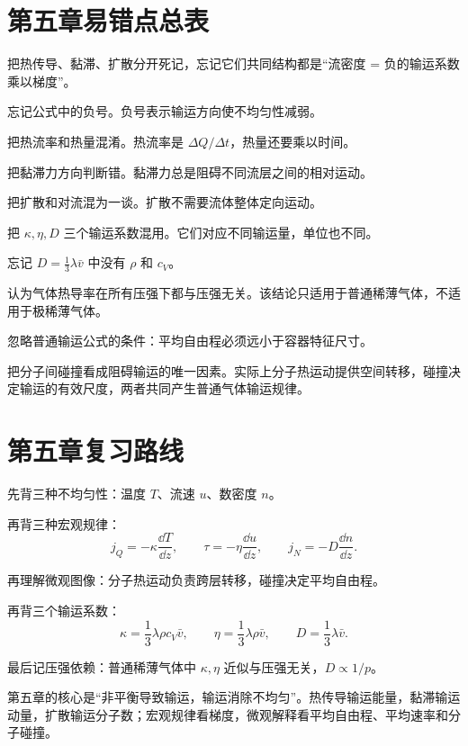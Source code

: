 \section{第五章易错点总表}

\begin{WarnBox}[本章高频错误]
\begin{PitfallList}
  \item 把热传导、黏滞、扩散分开死记，忘记它们共同结构都是“流密度 = 负的输运系数乘以梯度”。
  \item 忘记公式中的负号。负号表示输运方向使不均匀性减弱。
  \item 把热流率和热量混淆。热流率是 \(\Delta Q/\Delta t\)，热量还要乘以时间。
  \item 把黏滞力方向判断错。黏滞力总是阻碍不同流层之间的相对运动。
  \item 把扩散和对流混为一谈。扩散不需要流体整体定向运动。
  \item 把 \(\kappa,\eta,D\) 三个输运系数混用。它们对应不同输运量，单位也不同。
  \item 忘记 \(D=\frac13\lambda\bar v\) 中没有 \(\rho\) 和 \(c_V\)。
  \item 认为气体热导率在所有压强下都与压强无关。该结论只适用于普通稀薄气体，不适用于极稀薄气体。
  \item 忽略普通输运公式的条件：平均自由程必须远小于容器特征尺寸。
  \item 把分子间碰撞看成阻碍输运的唯一因素。实际上分子热运动提供空间转移，碰撞决定输运的有效尺度，两者共同产生普通气体输运规律。
\end{PitfallList}
\end{WarnBox}

\section{第五章复习路线}

\begin{MethodBox}[建议背诵顺序]
\begin{ReviewList}
  \item 先背三种不均匀性：温度 \(T\)、流速 \(u\)、数密度 \(n\)。
  \item 再背三种宏观规律：
  \[
    j_Q=-\kappa\frac{\dd T}{\dd z},
    \qquad
    \tau=-\eta\frac{\dd u}{\dd z},
    \qquad
    j_N=-D\frac{\dd n}{\dd z}.
  \]
  \item 再理解微观图像：分子热运动负责跨层转移，碰撞决定平均自由程。
  \item 再背三个输运系数：
  \[
    \kappa=\frac13\lambda\rho c_V\bar v,
    \qquad
    \eta=\frac13\lambda\rho\bar v,
    \qquad
    D=\frac13\lambda\bar v.
  \]
  \item 最后记压强依赖：普通稀薄气体中 \(\kappa,\eta\) 近似与压强无关，\(D\propto1/p\)。
\end{ReviewList}
\end{MethodBox}

\begin{KeyBox}[第五章一句话总结]
第五章的核心是“非平衡导致输运，输运消除不均匀”。热传导输运能量，黏滞输运动量，扩散输运分子数；宏观规律看梯度，微观解释看平均自由程、平均速率和分子碰撞。
\end{KeyBox}